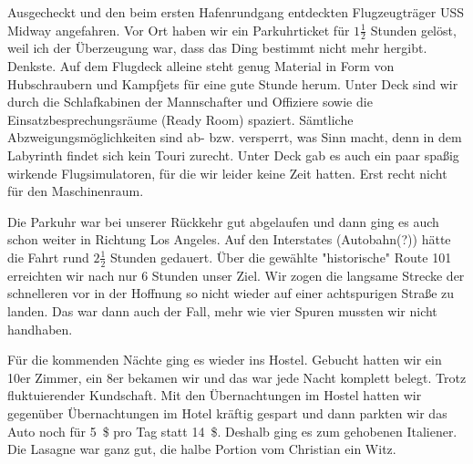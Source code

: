 Ausgecheckt und den beim ersten Hafenrundgang entdeckten Flugzeugträger USS Midway angefahren.
Vor Ort haben wir ein Parkuhrticket für $1 \frac{1}{2}$ Stunden gelöst, weil ich der Überzeugung war, dass das Ding bestimmt nicht mehr hergibt.
Denkste.
Auf dem Flugdeck alleine steht genug Material in Form von Hubschraubern und Kampfjets für eine gute Stunde herum.
Unter Deck sind wir durch die Schlafkabinen der Mannschafter und Offiziere sowie die Einsatzbesprechungsräume (Ready Room) spaziert.
Sämtliche Abzweigungsmöglichkeiten sind ab- bzw. versperrt, was Sinn macht, denn in dem Labyrinth findet sich kein Touri zurecht.
Unter Deck gab es auch ein paar spaßig wirkende Flugsimulatoren, für die wir leider keine Zeit hatten.
Erst recht nicht für den Maschinenraum.

Die Parkuhr war bei unserer Rückkehr gut abgelaufen und dann ging es auch schon weiter in Richtung Los Angeles.
Auf den Interstates (Autobahn(?)) hätte die Fahrt rund $2 \frac{1}{2}$ Stunden gedauert.
Über die gewählte "historische" Route 101 erreichten wir nach nur 6 Stunden unser Ziel.
Wir zogen die langsame Strecke der schnelleren vor in der Hoffnung so nicht wieder auf einer achtspurigen Straße zu landen.
Das war dann auch der Fall, mehr wie vier Spuren mussten wir nicht handhaben.


Für die kommenden Nächte ging es wieder ins Hostel.
Gebucht hatten wir ein 10er Zimmer, ein 8er bekamen wir und das war jede Nacht komplett belegt.
Trotz fluktuierender Kundschaft.
Mit den Übernachtungen im Hostel hatten wir gegenüber Übernachtungen im Hotel kräftig gespart und dann parkten wir das Auto noch für 5~\$ pro Tag statt 14~\$.
Deshalb ging es zum gehobenen Italiener.
Die Lasagne war ganz gut, die halbe Portion vom Christian ein Witz.
